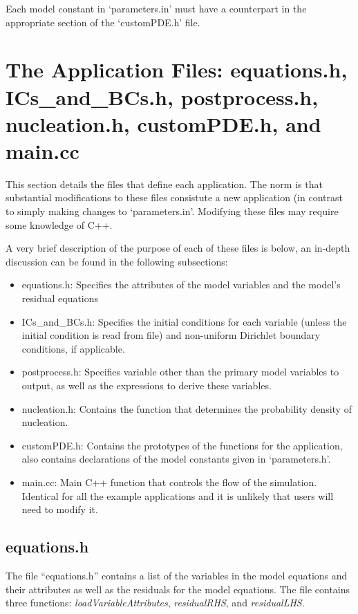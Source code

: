 \documentclass[10pt]{article} %
\begin{document}
Each model constant in `parameters.in' must have a counterpart in the appropriate section of the `customPDE.h' file. 



\section{The Application Files: equations.h, ICs\_and\_BCs.h, postprocess.h, nucleation.h, customPDE.h, and main.cc} \label{app_files}
This section details the files that define each application. The norm is that substantial modifications to these files consistute a new application (in contrast to simply making changes to `parameters.in'. Modifying these files may require some knowledge of C++.

A very brief description of the purpose of each of these files is below, an in-depth discussion can be found in the following subsections:
\begin{itemize}
\item equations.h: Specifies the attributes of the model variables and the model's residual equations
\item ICs\_and\_BCs.h: Specifies the initial conditions for each variable (unless the initial condition is read from file) and non-uniform Dirichlet boundary conditions, if applicable.
\item postprocess.h: Specifies variable other than the primary model variables to output, as well as the expressions to derive these variables.
\item nucleation.h: Contains the function that determines the probability density of nucleation.
\item customPDE.h: Contains the prototypes of the functions for the application, also contains declarations of the model constants given in `parameters.h'.
\item main.cc: Main C++ function that controls the flow of the simulation. Identical for all the example applications and it is unlikely that users will need to modify it.
\end{itemize}

\subsection{equations.h} \label{equations}
The file ``equations.h'' contains a list of the variables in the model equations and their attributes as well as the residuals for the model equations. The file contains three functions: \emph{loadVariableAttributes}, \emph{residualRHS}, and \emph{residualLHS}. 
\end{document}
